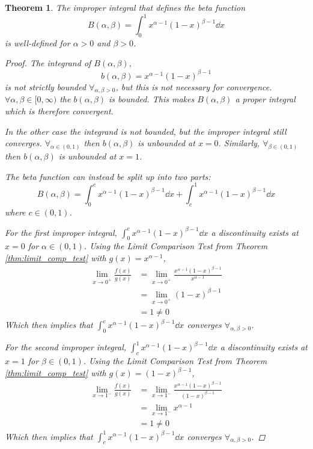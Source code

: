 \documentclass[]{article}
\newtheorem{theorem}{Theorem}
\begin{document}
\begin{theorem}
    The improper integral that defines the beta function \[
        B(\alpha,\beta) = \int_0^1 x^{\alpha-1} (1-x)^{\beta-1} \dd{x}
    \] is well-defined for $\alpha > 0$ and $\beta > 0$. 
    \begin{proof}
        The integrand of $B(\alpha,\beta)$, \[
            b(\alpha,\beta) = x^{\alpha-1} (1-x)^{\beta - 1}
        \] is not strictly bounded $\forall_{\alpha,\beta>0}$, but this is not necessary for convergence. 
        $\forall{\alpha,\beta \in [0,\infty)}$ the $b(\alpha,\beta)$ is bounded. 
        This makes $B(\alpha,\beta)$ a proper integral which is therefore convergent.

        In the other case the integrand is not bounded, but the improper integral still converges. 
        $\forall_{\alpha \in (0,1)}$ then $b(\alpha,\beta)$ is unbounded at $x = 0$.
        Similarly, $\forall_{\beta \in (0,1)}$ then $b(\alpha,\beta)$ is unbounded at $x = 1$.        

        The beta function can instead be split up into two parts:\[
            B(\alpha,\beta) 
                = \int_{0}^{c} x^{\alpha-1} (1-x)^{\beta-1} \dd{x}
                + \int_{c}^{1} x^{\alpha-1} (1-x)^{\beta-1} \dd{x}
        \] where $c \in (0,1)$.

        For the first improper integral, $\int_{0}^{c} x^{\alpha-1} (1-x)^{\beta-1} \dd{x}$
        a discontinuity exists at $x = 0$ for $\alpha \in (0,1)$. 
        Using the Limit Comparison Test from Theorem \ref{thm:limit_comp_test} with $g(x) = x^{\alpha - 1}$, 
        \begin{align*}
            \lim_{x\to 0^{+}} \frac{f(x)}{g(x)} 
                &= \lim_{x\to 0^{+}} \frac{x^{\alpha-1} (1-x)^{\beta-1}}{x^{\alpha - 1}}\\
                &= \lim_{x\to 0^{+}} (1-x)^{\beta-1}\\
                &= 1 \neq 0
        \end{align*}
        Which then implies that $\int_{0}^{c} x^{\alpha-1} (1-x)^{\beta-1} \dd{x}$ 
        converges $\forall_{\alpha,\beta > 0}$.

        For the second improper integral, $\int_{c}^{1} x^{\alpha-1} (1-x)^{\beta-1} \dd{x}$
        a discontinuity exists at $x = 1$ for $\beta \in (0,1)$. 
        Using the Limit Comparison Test from Theorem \ref{thm:limit_comp_test} with $g(x) = (1-x)^{\beta - 1}$, 
        \begin{align*}
            \lim_{x\to 1^{-}} \frac{f(x)}{g(x)} 
                &= \lim_{x\to 1^{-}} \frac{x^{\alpha-1} (1-x)^{\beta-1}}{(1-x)^{\beta - 1}}\\
                &= \lim_{x\to 1^{-}} x^{\alpha - 1}\\
                &= 1 \neq 0
        \end{align*}
        Which then implies that $\int_{c}^{1} x^{\alpha-1} (1-x)^{\beta-1} \dd{x}$ 
        converges $\forall_{\alpha,\beta > 0}$.


\end{proof}
\end{theorem}
\end{document}

